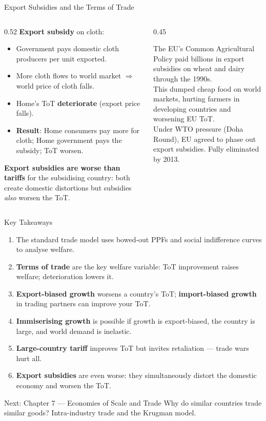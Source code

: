 \documentclass[aspectratio=169]{beamer}
\begin{document}
\begin{frame}{Export Subsidies and the Terms of Trade}
\begin{columns}
\begin{column}{0.52\textwidth}
\textbf{Export subsidy} on cloth:
\begin{itemize}
  \item Government pays domestic cloth producers per unit exported.
  \item More cloth flows to world market $\Rightarrow$ world price of cloth falls.
  \item Home's ToT \textbf{deteriorate} (export price falls).
  \item \textbf{Result}: Home consumers pay more for cloth; Home government pays the subsidy; ToT worsen.
\end{itemize}
\vspace{0.2em}
\textbf{Export subsidies are worse than tariffs} for the subsidising country: both create domestic distortions but subsidies \emph{also} worsen the ToT.
\end{column}
\begin{column}{0.45\textwidth}
\begin{canadex}
  The EU's Common Agricultural Policy paid billions in export subsidies on wheat and dairy through the 1990s.\\[0.3em]
  This dumped cheap food on world markets, hurting farmers in developing countries and worsening EU ToT.\\[0.3em]
  Under WTO pressure (Doha Round), EU agreed to phase out export subsidies. Fully eliminated by 2013.
\end{canadex}
\end{column}
\end{columns}
\end{frame}

\begin{frame}{Key Takeaways}
\begin{enumerate}
  \item The standard trade model uses bowed-out PPFs and social indifference curves to analyse welfare.
  \item \textbf{Terms of trade} are the key welfare variable: ToT improvement raises welfare; deterioration lowers it.
  \item \textbf{Export-biased growth} worsens a country's ToT; \textbf{import-biased growth} in trading partners can improve your ToT.
  \item \textbf{Immiserising growth} is possible if growth is export-biased, the country is large, and world demand is inelastic.
  \item \textbf{Large-country tariff} improves ToT but invites retaliation --- trade wars hurt all.
  \item \textbf{Export subsidies} are even worse: they simultaneously distort the domestic economy and worsen the ToT.
\end{enumerate}
\begin{block}{Next: Chapter 7 --- Economies of Scale and Trade}
  Why do similar countries trade similar goods? Intra-industry trade and the Krugman model.
\end{block}
\end{frame}
\end{document}
